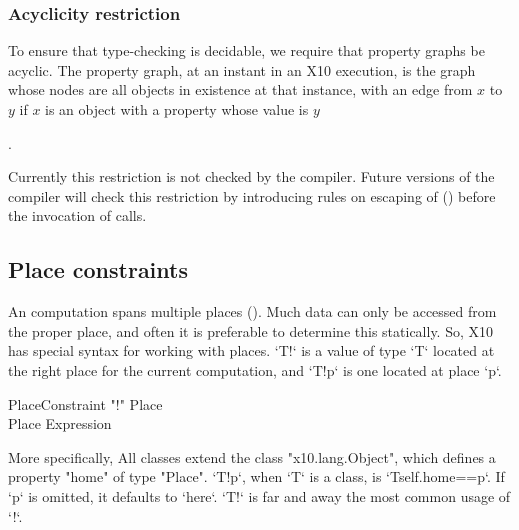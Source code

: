 {%



\subsubsection{Acyclicity restriction}

To ensure that type-checking is decidable, we require that property graphs be
acyclic.  The property graph, at an instant in an X10 execution, is the graph
whose nodes are all objects in existence at that instance, with an edge from
{$x$} to {$y$} if {$x$} is an object with a property whose value is {$y$}{. 


Currently this restriction is not checked by the compiler. Future
versions of the compiler will check this restriction by introducing
rules on escaping of  () before the invocation of
 calls.


\subsection{Place constraints}
\label{PlaceTypes}
\label{PlaceType}
\label{DepType:PlaceType}

An \Xten{} computation spans multiple places (). Much data
can only be accessed from the proper place, and often it is preferable to
determine this statically. So, X10 has special syntax for working with places.
\xcd`T!` is a value of type \xcd`T` located at the right place for the current
computation, and \xcd`T!p` is one located at place \xcd`p`.

\begin{grammar}
PlaceConstraint     \: \xcd"!" Place\opt \\
Place              \:   Expression \\
\end{grammar}

More specifically, All \Xten{} classes extend the class \xcd"x10.lang.Object",
which defines a property \xcd"home" of type \xcd"Place".  \xcd`T!p`, when
\xcd`T` is a class, is \xcd`T{self.home==p}`.  If \xcd`p` is omitted, it
defaults to \xcd`here`.   \xcd`T!` is far and away the most common usage of
\xcd`!`. 

}}
